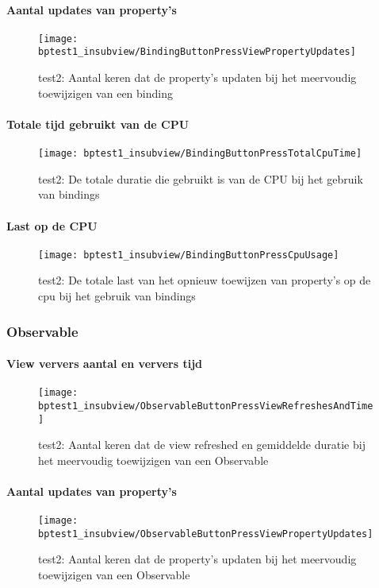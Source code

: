 \paragraph{Aantal updates van property's}
\begin{figure}[H]
    \centering
    \texttt{[image: bptest1\_insubview/BindingButtonPressViewPropertyUpdates]} 
    \caption{test2: Aantal keren dat de property's updaten bij het meervoudig toewijzigen van een binding}
    \label{fig:propertyUpdatesBinding1}
\end{figure}
\paragraph{Totale tijd gebruikt van de CPU}
\begin{figure}[H]
    \centering
    \texttt{[image: bptest1\_insubview/BindingButtonPressTotalCpuTime]} 
    \caption{test2: De totale duratie die gebruikt is van de CPU bij het gebruik van bindings}
    \label{fig:cpuUsageTimeBinding1}
\end{figure}
\paragraph{Last op de CPU}
\begin{figure}[H]
    \centering
    \texttt{[image: bptest1\_insubview/BindingButtonPressCpuUsage]} 
    \caption{test2: De totale last van het opnieuw toewijzen van property's op de cpu bij het gebruik van bindings}
    \label{fig:cpuWeightBinding1}
\end{figure}

\subsubsection{Observable}
\paragraph{View ververs aantal en ververs tijd}
\begin{figure}[H]
    \centering
    \texttt{[image: bptest1\_insubview/ObservableButtonPressViewRefreshesAndTime]} 
    \caption{test2: Aantal keren dat de view refreshed en gemiddelde duratie bij het meervoudig toewijzigen van een Observable}
    \label{fig:viewRefreshesObservable1}
\end{figure}
\paragraph{Aantal updates van property's}
\begin{figure}[H]
    \centering
    \texttt{[image: bptest1\_insubview/ObservableButtonPressViewPropertyUpdates]} 
    \caption{test2: Aantal keren dat de property's updaten bij het meervoudig toewijzigen van een Observable}
    \label{fig:propertyUpdatesObservable1}
\end{figure}
